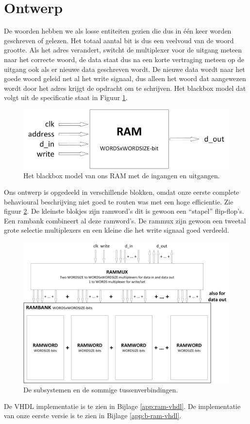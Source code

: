 \documentclass{scrartcl}  %
\begin{document}
\section{Ontwerp}
De woorden hebben we als losse entiteiten gezien die dus in één keer worden geschreven of gelezen.
Het totaal aantal bit is dus een veelvoud van de woord grootte.
Als het adres verandert, switcht de multiplexer voor de uitgang meteen naar het correcte woord, de data staat dus na een korte vertraging meteen op de uitgang ook als er nieuwe data geschreven wordt.
De nieuwe data wordt naar het goede woord geleid net al het write signaal, dus alleen het woord dat aangewezen wordt door het adres krijgt de opdracht om te schrijven.
Het blackbox model dat volgt uit de specificatie staat in Figuur \ref{fig:blackbox-ram}.
\begin{figure}[H]
\centering
		\includegraphics[width=\textwidth]{resource/blackbox-ram}
		\caption{Het blackbox model van ons RAM met de ingangen en uitgangen.}
		\label{fig:blackbox-ram}
\end{figure}
Ons ontwerp is opgedeeld in verschillende blokken, omdat onze eerste complete behavioural beschrijving niet goed te routen was met een hoge efficientie. Zie figuur \ref{fig:subsystems-ram}.
De kleinste blokjes zijn ramword’s dit is gewoon een “stapel” flip-flop’s.
Een rambank combineert al deze ramword’s.
De rammux zijn gewoon een tweetal grote selectie multiplexers en een kleine die het write signaal goed verdeeld.
\begin{figure}[H]
\centering
		\includegraphics[width=\textwidth]{resource/subsystems-ram}
		\caption{De subsystemen en de sommige tussenverbindingen.}
		\label{fig:subsystems-ram}
\end{figure}
De VHDL implementatie is te zien in Bijlage \ref{app:ram-vhdl}. De implementatie van onze eerste versie is te zien in Bijlage \ref{app:b-ram-vhdl}.
\end{document}
